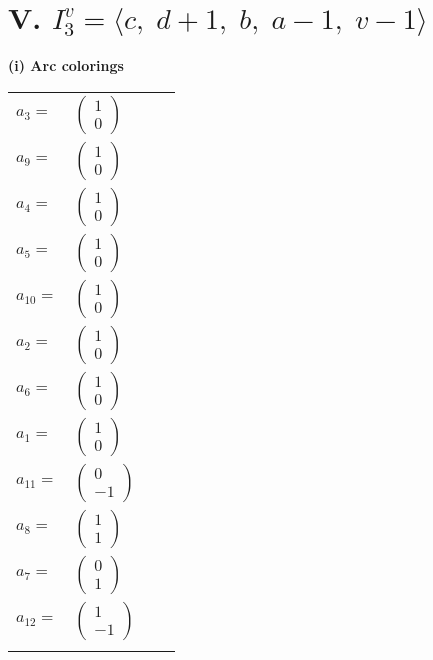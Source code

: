 \documentclass[1p]{elsarticle_modified}
\theoremstyle{definition}
\begin{document}
\centering \section*{V. $I^v_{3}= \langle c,\;d+1,\;b,\;a-1,\;v-1 \rangle$}
\flushleft \textbf{(i) Arc colorings}\\
\begin{tabular}{m{7pt} m{180pt} m{7pt} m{180pt} }
\flushright $a_{3}=$&$\begin{pmatrix}1\\0\end{pmatrix}$ \\
\flushright $a_{9}=$&$\begin{pmatrix}1\\0\end{pmatrix}$ \\
\flushright $a_{4}=$&$\begin{pmatrix}1\\0\end{pmatrix}$ \\
\flushright $a_{5}=$&$\begin{pmatrix}1\\0\end{pmatrix}$ \\
\flushright $a_{10}=$&$\begin{pmatrix}1\\0\end{pmatrix}$ \\
\flushright $a_{2}=$&$\begin{pmatrix}1\\0\end{pmatrix}$ \\
\flushright $a_{6}=$&$\begin{pmatrix}1\\0\end{pmatrix}$ \\
\flushright $a_{1}=$&$\begin{pmatrix}1\\0\end{pmatrix}$ \\
\flushright $a_{11}=$&$\begin{pmatrix}0\\-1\end{pmatrix}$ \\
\flushright $a_{8}=$&$\begin{pmatrix}1\\1\end{pmatrix}$ \\
\flushright $a_{7}=$&$\begin{pmatrix}0\\1\end{pmatrix}$ \\
\flushright $a_{12}=$&$\begin{pmatrix}1\\-1\end{pmatrix}$\\&\end{tabular}
\end{document}
